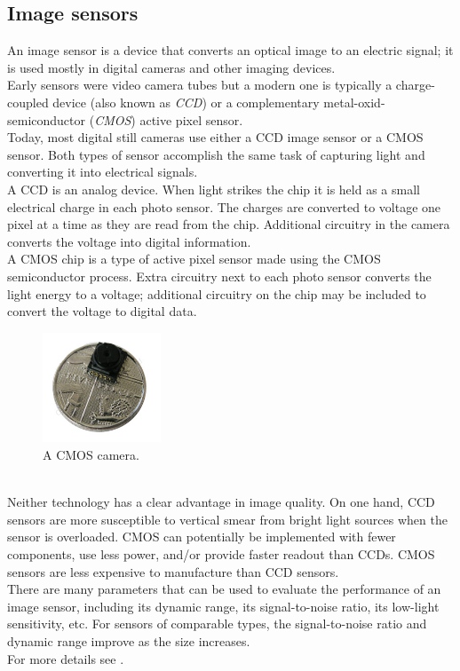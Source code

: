 \subsection{Image sensors}
\label{intro:mobile:image}

An image sensor is a device that converts an optical image to an electric
signal; it is used mostly in digital cameras and other imaging devices.
\\
Early sensors were video camera tubes but a modern one is typically a
charge-coupled device (also known as \textit{CCD}) or a complementary
metal-oxid-semiconductor (\textit{CMOS}) active pixel sensor.
\\
Today, most digital still cameras use either a CCD image sensor or a
CMOS sensor. Both types of sensor accomplish the same task of capturing
light and converting it into electrical signals.
\\
A CCD is an analog device. When light strikes the chip it is held as a small
electrical charge in each photo sensor. The charges are converted to voltage
one pixel at a time as they are read from the chip. Additional circuitry in
the camera converts the voltage into digital information.
\\
A CMOS chip is a type of active pixel sensor made using the CMOS semiconductor
process. Extra circuitry next to each photo sensor converts the light
energy to a voltage; additional circuitry on the chip may be included
to convert the voltage to digital data.
\begin{figure} [h]
  \begin{center}
    \includegraphics[width=100pt]{img/cmos_camera.jpg}
    \caption{A CMOS camera.}
    \label{fig:cmos_camera}
  \end{center}
\end{figure}
\\
Neither technology has a clear advantage in image quality. On one hand,
CCD sensors are more susceptible to vertical smear from bright light sources
when the sensor is overloaded.
CMOS can potentially be implemented with fewer components, use less power,
and/or provide faster readout than CCDs.
CMOS sensors are less expensive to manufacture than CCD sensors.
\\
There are many parameters that can be used to evaluate the performance
of an image sensor, including its dynamic range, its signal-to-noise ratio,
its low-light sensitivity, etc. For sensors of comparable types,
the signal-to-noise ratio and dynamic range improve as the size increases.
\\
For more details see \cite{wiki:image_sensor}.


